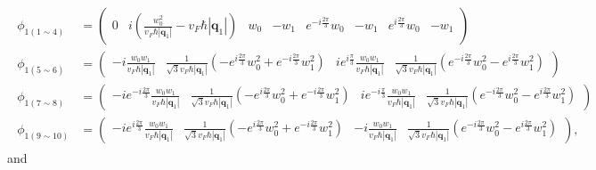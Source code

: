 \documentclass[10pt, oneside]{article}
\newcommand{\p}[1]{\left(#1\right)}
\newcommand{\bv}[1]{\left|#1\right|}
\begin{document}
\begin{align}
	\begin{split}
		\phi_{1\p{1 \sim 4}} & = \begin{pmatrix}
			0 & i \p{\frac{w_{0}^{2}}{v_F \hbar \bv{\bm{q}_1}} - v_F \hbar \bv{\bm{q}_1}} & w_0 & - w_1 & e^{-i \frac{2\pi}{3}} w_0 & - w_1 &  e^{i \frac{2\pi}{3}} w_0 & - w_1 
		\end{pmatrix} \\
		\phi_{1 \p{5 \sim 6}} &  = \begin{pmatrix}
			-i \frac{w_0 w_1}{v_F \hbar \bv{\bm{q}_1}} & \frac{1}{\sqrt{3} v_F \hbar \bv{\bm{q}_1}} \p{- e^{i \frac{2\pi}{3}} w_{0}^{2} + e^{-i \frac{2\pi}{3}} w_{1}^{2}} & i e^{i \frac{\pi}{3}} \frac{w_0 w_1}{v_F \hbar \bv{\bm{q}_1}} & \frac{1}{\sqrt{3}  v_F \hbar \bv{\bm{q}_1}} \p{e^{-i \frac{2\pi}{3}} w_{0}^{2} - e^{i \frac{2\pi}{3}} w_{1}^{2}} 
		\end{pmatrix} \\
		\phi_{1 \p{7 \sim 8}} & = \begin{pmatrix}
			- i e^{-i \frac{2\pi}{3}} \frac{w_0 w_1}{v_F \hbar \bv{\bm{q}_1}} & \frac{1}{\sqrt{3} v_F \hbar \bv{\bm{q}_1}} \p{- e^{i \frac{2\pi}{3}} w_{0}^{2} + e^{-i \frac{2\pi}{3}} w_{1}^{2}} & i e^{-i \frac{\pi}{3}} \frac{w_0 w_1}{ v_F \hbar \bv{\bm{q}_1}} & \frac{1}{\sqrt{3} v_F \hbar \bv{\bm{q}_1}} \p{e^{-i \frac{2\pi}{3}} w_{0}^{2} - e^{i \frac{2\pi}{3}} w_{1}^{2}} 
		\end{pmatrix} \\
		\phi_{1 \p{9 \sim 10}} & = \begin{pmatrix}
			- i e^{i \frac{2\pi}{3}} \frac{w_0 w_1}{v_F \hbar \bv{\bm{q}_1}} & \frac{1}{\sqrt{3} v_F \hbar \bv{\bm{q}_1}} \p{- e^{i \frac{2\pi}{3}} w_{0}^{2} + e^{-i \frac{2\pi}{3}} w_{1}^{2}} &  - i \frac{w_0 w_1}{v_F \hbar \bv{\bm{q}_1}} & \frac{1}{\sqrt{3} v_F \hbar \bv{\bm{q}_1}} \p{e^{-i \frac{2\pi}{3}} w_{0}^{2} - e^{i \frac{2\pi}{3}} w_{1}^{2}} 
		\end{pmatrix},
	\end{split}
\end{align}
and 
\end{document}
